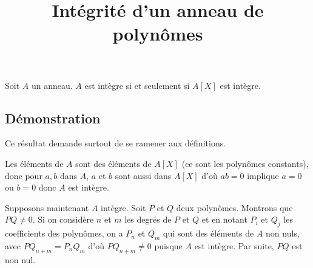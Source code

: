 \documentclass[fontsize=12pt,twoside=false,parskip=half, french]{scrartcl}
\title{Intégrité d'un anneau de polynômes}
\date{}
\author{}
\begin{document}
\maketitle 
   \begin{Theoreme}
       Soit $A$ un anneau. $A$ est intègre si et seulement si $A[X]$ est intègre.
   \end{Theoreme}
   \subsection{Démonstration}
      Ce résultat demande surtout de se ramener aux définitions.
      
      Les éléments de $A$ sont des éléments de $A[X]$ (ce sont les polynômes constants),
      donc pour $a, b$ dans $A$, $a$ et $b$ sont aussi dans $A[X]$ d'où $ab = 0$
      implique $a = 0$ ou $b = 0$ donc $A$ est intègre.
      
      Supposons maintenant $A$ intègre. Soit $P$ et $Q$ deux polynômes. Montrons
      que $PQ \neq 0$. Si on considère $n$ et $m$ les degrés de $P$ et $Q$ et 
      en notant $P_i$ et $Q_j$ les coefficients des polynômes, on a 
      $P_n$ et $Q_m$ qui sont des éléments de $A$ non nuls,  avec $PQ_{n + m} = P_nQ_m$
      d'où $PQ_{n + m} \neq 0$ puisque $A$ est intègre. Par suite, $PQ$ est non nul.
\end{document}
